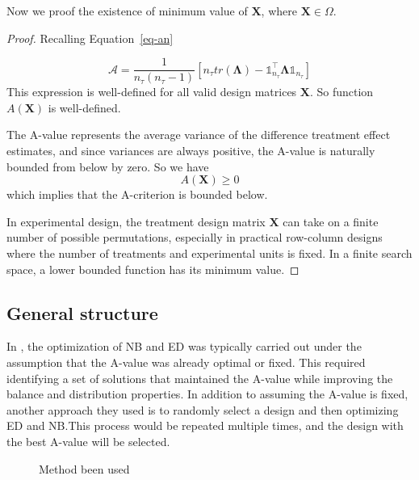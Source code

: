 \documentclass[
  a4paper,
  oneside,
  openany,
  12pt,
  onecolumn]{book}
\theoremstyle{definition}
\theoremstyle{plain}
\theoremstyle{remark}
\begin{document}
Now we proof the existence of minimum value of \(\boldsymbol{X}\), where
\(\boldsymbol{X}\in\Omega\).

\begin{proof}
Recalling Equation~\ref{eq-an}

\[
\mathcal{A}=\frac{1}{n_{\tau}(n_{\tau}-1)}[n_{\tau}tr(\boldsymbol{\Lambda})-\mathbb{1}_{n_{\tau}}^\top\boldsymbol{\Lambda}\mathbb{1}_{n_{\tau}}]
\] This expression is well-defined for all valid design matrices
\(\boldsymbol{X}\). So function \(A(\boldsymbol{X})\) is well-defined.

The A-value represents the average variance of the difference treatment
effect estimates, and since variances are always positive, the A-value
is naturally bounded from below by zero. So we have \[
A(\boldsymbol{X})\geq0
\] which implies that the A-criterion is bounded below.

In experimental design, the treatment design matrix \(\boldsymbol{X}\)
can take on a finite number of possible permutations, especially in
practical row-column designs where the number of treatments and
experimental units is fixed. In a finite search space, a lower bounded
function has its minimum value.
\end{proof}

\subsection{General structure}\label{general-structure}

In \citet{piepho2018neighbor}, the optimization of NB and ED was
typically carried out under the assumption that the A-value was already
optimal or fixed. This required identifying a set of solutions that
maintained the A-value while improving the balance and distribution
properties. In addition to assuming the A-value is fixed, another
approach they used is to randomly select a design and then optimizing ED
and NB.This process would be repeated multiple times, and the design
with the best A-value will be selected.

\begin{figure}


\caption{\label{fig-method1}Method been used}

\end{figure}%
\end{document}
